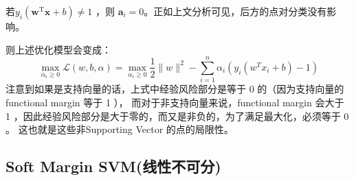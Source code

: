 \begin{outline}
若$y_{i}\left(\mathbf{w}^{\mathrm{T}} \mathbf{x}+b\right)\neq  1$ ，则 $ \boldsymbol{a}_{i}=0 $。正如上文分析可见，后方的点对分类没有影响。

则上述优化模型会变成：
\begin{equation}
	\max _{\alpha_{i} \geq 0} \mathcal{L}(w, b, \alpha)=\max _{\alpha_{i} \geq 0} \frac{1}{2}\|w\|^{2}-\sum_{i=1}^{n} \alpha_{i}\left(y_{i}\left(w^{T} x_{i}+b\right)-1\right)
\end{equation}
注意到如果是支持向量的话，上式中经验风险部分是等于 0 的（因为支持向量的 functional margin 等于 1 ），
而对于非支持向量来说，functional margin 会大于 1 ，因此经验风险部分是大于零的，而又是非负的，为了满足最大化，必须等于 0 。
这也就是这些非Supporting Vector 的点的局限性。 
\end{outline}




\subsection{Soft Margin SVM(线性不可分)}

